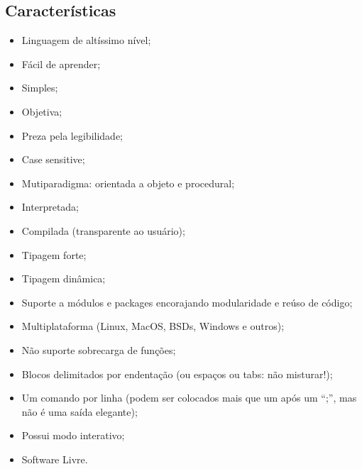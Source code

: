 \documentclass[letterpaper,10pt,brazil]{sphinxmanual}
\begin{document}
\subsection{Características}
\label{\detokenize{content/about:caracteristicas}}\begin{itemize}
\item {} 
Linguagem de altíssimo nível;

\item {} 
Fácil de aprender;

\item {} 
Simples;

\item {} 
Objetiva;

\item {} 
Preza pela legibilidade;

\item {} 
Case sensitive;

\item {} 
Mutiparadigma: orientada a objeto e procedural;

\item {} 
Interpretada;

\item {} 
Compilada (transparente ao usuário);

\item {} 
Tipagem forte;

\item {} 
Tipagem dinâmica;

\item {} 
Suporte a módulos e packages encorajando modularidade e reúso de código;

\item {} 
Multiplataforma (Linux, MacOS, BSDs, Windows e outros);

\item {} 
Não suporte sobrecarga de funções;

\item {} 
Blocos delimitados por endentação (ou espaços ou tabs: não misturar!);

\item {} 
Um comando por linha (podem ser colocados mais que um após um “;”, mas não é uma saída elegante);

\item {} 
Possui modo interativo;

\item {} 
Software Livre.

\end{itemize}
\end{document}
